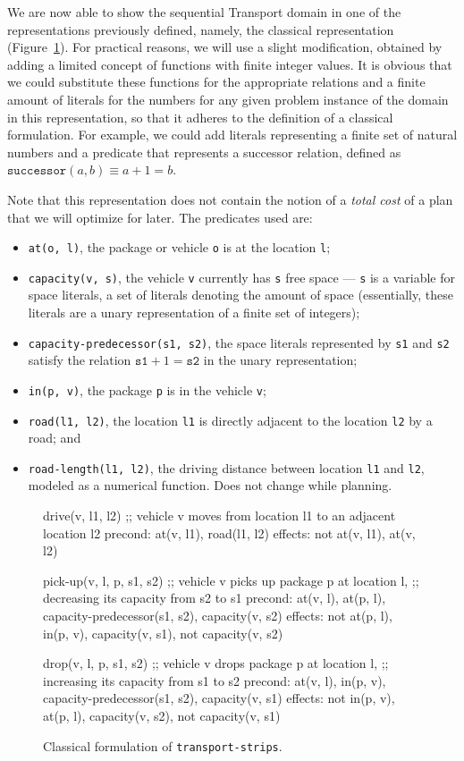We are now able to show the sequential Transport domain in one of the representations
previously defined, namely,
the classical representation (Figure~\ref{code:classical-strips}).
For practical reasons, we will use a slight modification, obtained by adding a limited concept of functions
with finite integer values.
It is obvious that we could substitute these functions for the appropriate relations
and a finite amount of literals for the numbers for any given problem instance of
the domain in this representation,
so that it adheres to the definition of a classical formulation.
For example, we could add literals representing a finite set of
natural numbers and a predicate that represents
a successor relation, defined as $\texttt{successor}(a, b) \equiv a + 1 = b$.

Note that this representation does not contain the notion of a \textit{total cost}
of a plan that we will optimize for later.
The predicates used are:
\begin{itemize}
\item \verb+at(o, l)+, the package or vehicle \verb+o+ is at the
location \verb+l+;
\item \verb+capacity(v, s)+, the vehicle \verb+v+ currently has \verb+s+ free space --- \verb+s+ is a variable for space literals, a set of literals denoting the amount of space (essentially,
these literals are a unary representation of a finite set of integers);
\item \verb+capacity-predecessor(s1, s2)+, the space literals represented by \verb+s1+ and \verb+s2+
satisfy the relation $\texttt{s1} + 1 = \texttt{s2}$
in the unary representation;
\item \verb+in(p, v)+, the package \verb+p+ is in the vehicle \verb+v+;
\item \verb+road(l1, l2)+, the location \verb+l1+ is directly adjacent to the location
\verb+l2+ by a road; and
\item \verb+road-length(l1, l2)+, the driving distance between location \verb+l1+
and \verb+l2+, modeled as a numerical function. Does not change while planning.
\end{itemize}

\begin{figure}[tbp]
\begin{code}
drive(v, l1, l2)
  ;; vehicle v moves from location l1 to an adjacent location l2
  precond: at(v, l1), road(l1, l2)
  effects: not at(v, l1), at(v, l2)

pick-up(v, l, p, s1, s2)
  ;; vehicle v picks up package p at location l,
  ;; decreasing its capacity from s2 to s1
  precond: at(v, l), at(p, l), capacity-predecessor(s1, s2),
           capacity(v, s2)
  effects: not at(p, l), in(p, v), capacity(v, s1),
           not capacity(v, s2)
  
drop(v, l, p, s1, s2)
  ;; vehicle v drops package p at location l,
  ;; increasing its capacity from s1 to s2
  precond: at(v, l), in(p, v), capacity-predecessor(s1, s2),
           capacity(v, s1)
  effects: not in(p, v), at(p, l), capacity(v, s2),
           not capacity(v, s1)
\end{code}
\caption{Classical formulation of \texttt{transport-strips}.}
\label{code:classical-strips}
\end{figure}

